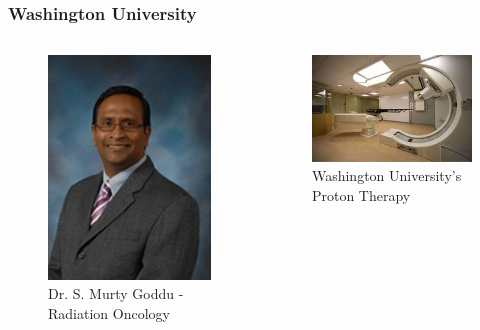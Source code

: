 \begin{frame}
\frametitle{Washington University}
\begin{columns}
	\column[t]{5cm}
	\begin{figure}
		\includegraphics[width=0.7\linewidth]{goddu}
		\caption{Dr. S. Murty Goddu - Radiation Oncology}
	\end{figure}
	\column[t]{6cm}
	\begin{figure}
		\includegraphics[width=\linewidth]{proton}
		\caption{Washington University's Proton Therapy}
	\end{figure}
\end{columns}
\end{frame}

